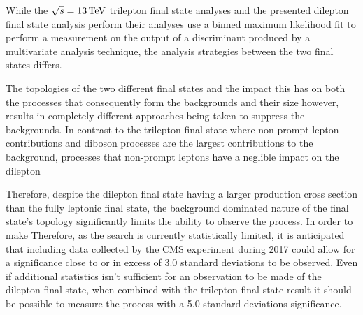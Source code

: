 While the $\sqrt{s} = 13 \,\text{Te\hspace{-.08em}V}$ trilepton final state analyses and the presented dilepton final state analysis perform their analyses use a binned maximum likelihood fit to perform a measurement on the output of a discriminant produced by a multivariate analysis technique, the analysis strategies between the two final states differs.


The topologies of the two different final states and the impact this has on both the processes that consequently form the backgrounds and their size however, results in completely different approaches being taken to suppress the backgrounds.
In contrast to the trilepton final state where non-prompt lepton contributions and diboson processes are the largest contributions to the background, processes that non-prompt leptons have a neglible impact on the dilepton 

Therefore, despite the dilepton final state having a larger production cross section than the fully leptonic final state, the background dominated nature of the final state's topology significantly limits the ability to observe the process.
In order to make 
Therefore, as the search is currently statistically limited, it is anticipated that including data collected by the CMS experiment during 2017 could allow for a significance close to or in excess of 3.0 standard deviations to be observed.
Even if additional statistics isn't sufficient for an observation to be made of the dilepton final state, when combined with the trilepton final state result it should be possible to measure the process with a 5.0 standard deviations significance.
